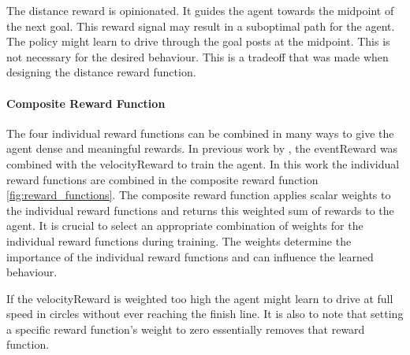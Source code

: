 The distance reward is opinionated. It guides the agent towards the midpoint of the next goal. This reward signal may result in a suboptimal path for the agent. The policy might learn to drive through the goal posts at the midpoint. This is not necessary for the desired behaviour. This is a tradeoff that was made when designing the distance reward function.

\paragraph{Composite Reward Function}
The four individual reward functions can be combined in many ways to give the agent dense and meaningful rewards. In previous work by \textcite{maximilian}, the eventReward was combined with the velocityReward to train the agent. In this work the individual reward functions are combined in the composite reward function \ref{fig:reward_functions}. The composite reward function applies scalar weights to the individual reward functions and returns this weighted sum of rewards to the agent. It is crucial to select an appropriate combination of weights for the individual reward functions during training. The weights determine the importance of the individual reward functions and can influence the learned behaviour.

If the velocityReward is weighted too high the agent might learn to drive at full speed in circles without ever reaching the finish line. It is also to note that setting a specific reward function's weight to zero essentially removes that reward function.

